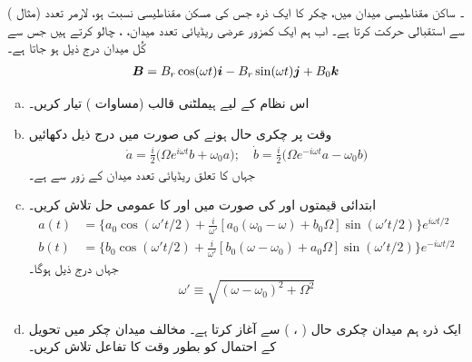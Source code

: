 ۔ ساکن مقناطیسی میدان  میں،  چکر کا ایک ذرہ جس کی مسکن مقناطیسی نسبت  ہو، لارمر تعدد  (مثال ) سے استقبالی حرکت کرتا ہے۔ اب ہم ایک کمزور عرضی ریڈیائی تعدد میدان، ، چالو کرتے ہیں جس سے کُل میدان درج ذیل ہو جاتا ہے۔
\begin{align}
	{\ensuremath{{\boldsymbol{B}}}} = B_{r}\cos(\omega t){\boldsymbol{i}} - B_{r}\sin(\omega t){\boldsymbol{j}} + B_0{\boldsymbol{k}}
\end{align} 
\begin{enumerate}[a.]
\item
اس نظام کے لیے  ہیملٹنی قالب (مساوات ) تیار کریں۔
\item
 وقت  پر چکری حال  ہونے کی صورت میں درج ذیل دکھائیں
\begin{align}
	\dot{a} = \frac{i}{2}\big(\Omega e^{i\omega t}b+\omega_0 a\big); \quad\dot{b} = \frac{i}{2}\big(\Omega e^{-i\omega t}a-\omega_0 b\big)
\end{align}
جہاں  کا تعلق ریڈیائی تعدد میدان کے زور سے ہے۔
\item
 ابتدائی قیمتوں  اور  کی صورت میں  اور  کا عمومی حل تلاش کریں۔  
\begin{align*}
	a(t) &= \bigg\{a_0\cos(\omega't/2)+\frac{i}{\omega'}[a_0(\omega_0-\omega)+b_0\Omega]\sin(\omega't/2)\bigg\}e^{i\omega t/2} \\
	b(t) &= \bigg\{b_0\cos(\omega't/2)+\frac{i}{\omega'}[b_0(\omega-\omega_0)+a_0\Omega]\sin(\omega't/2)\bigg\}e^{-i\omega t/2} 
\end{align*}
جہاں درج ذیل ہوگا۔
\begin{align}
	\omega'\equiv\sqrt{(\omega-\omega_0)^2+\Omega^2}
\end{align}
\item
 ایک ذرہ ہم میدان چکری حال ( ، ) سے آغاز کرتا ہے۔ مخالف میدان چکر میں تحویل کے احتمال کو بطور وقت کا تفاعل تلاش کریں۔


\end{enumerate}
